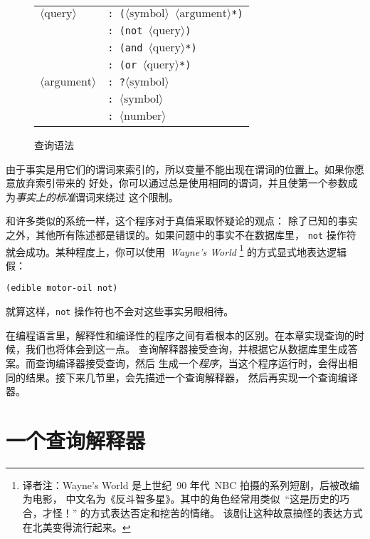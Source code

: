 \begin{figure}
  \begin{tabular}{ll}
    $\langle\mathrm{query}\rangle$ & \texttt{: ($\langle\mathrm{symbol}\rangle$ $\langle\mathrm{argument}\rangle$*)} \\
    & \texttt{: (not $\langle\mathrm{query}\rangle$)} \\
    & \texttt{: (and $\langle\mathrm{query}\rangle$*)} \\
    & \texttt{: (or $\langle\mathrm{query}\rangle$*)} \\
    $\langle\mathrm{argument}\rangle$ & \texttt{: ?$\langle\mathrm{symbol}\rangle$} \\
    & \texttt{: $\langle\mathrm{symbol}\rangle$} \\
    & \texttt{: $\langle\mathrm{number}\rangle$}
  \end{tabular}
  \caption{查询语法}
  \label{fig:syntax_of_queries}
\end{figure}

由于事实是用它们的谓词来索引的，所以变量不能出现在谓词的位置上。如果你愿意放弃索引带来的
好处，你可以通过总是使用相同的谓词，并且使第一个参数成为\emph{事实上的标准}谓词来绕过
这个限制。

和许多类似的系统一样，这个程序对于真值采取怀疑论的观点：
除了已知的事实之外，其他所有陈述都是错误的。如果问题中的事实不在数据库里，
\texttt{not} 操作符就会成功。某种程度上，你可以使用~\emph{Wayne's World}
\footnote{译者注：Wayne's World 是上世纪~90 年代~NBC 拍摄的系列短剧，后被改编为电影，
中文名为《反斗智多星》。其中的角色经常用类似~``这是历史的巧合，才怪！'' 的方式表达否定和挖苦的情绪。
该剧让这种故意搞怪的表达方式在北美变得流行起来。} 的方式显式地表达逻辑假：
\begin{lstlisting}
(edible motor-oil not)
\end{lstlisting}
就算这样，\texttt{not} 操作符也不会对这些事实另眼相待。

在编程语言里，解释性和编译性的程序之间有着根本的区别。在本章实现查询的时候，我们也将体会到这一点。
查询解释器接受查询，并根据它从数据库里生成答案。而查询编译器接受查询，然后
生成一个\emph{程序}，当这个程序运行时，会得出相同的结果。接下来几节里，会先描述一个查询解释器，
然后再实现一个查询编译器。

\section{一个查询解释器}
\label{sec:a_query_interpreter}

